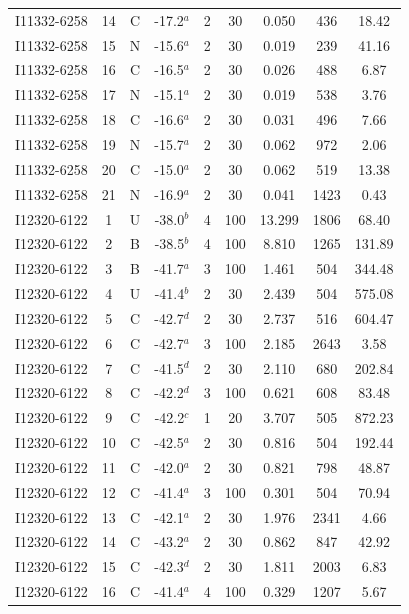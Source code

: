 \begin{table}
\begin{tabular}{ccccccccc}
I11332-6258 & 14 & C & -17.2$^{a}$ & 2 & 30 & 0.050 & 436 & 18.42 \\
I11332-6258 & 15 & N & -15.6$^{a}$ & 2 & 30 & 0.019 & 239 & 41.16 \\
I11332-6258 & 16 & C & -16.5$^{a}$ & 2 & 30 & 0.026 & 488 & 6.87 \\
I11332-6258 & 17 & N & -15.1$^{a}$ & 2 & 30 & 0.019 & 538 & 3.76 \\
I11332-6258 & 18 & C & -16.6$^{a}$ & 2 & 30 & 0.031 & 496 & 7.66 \\
I11332-6258 & 19 & N & -15.7$^{a}$ & 2 & 30 & 0.062 & 972 & 2.06 \\
I11332-6258 & 20 & C & -15.0$^{a}$ & 2 & 30 & 0.062 & 519 & 13.38 \\
I11332-6258 & 21 & N & -16.9$^{a}$ & 2 & 30 & 0.041 & 1423 & 0.43 \\
I12320-6122 & 1 & U & -38.0$^{b}$ & 4 & 100 & 13.299 & 1806 & 68.40 \\
I12320-6122 & 2 & B & -38.5$^{b}$ & 4 & 100 & 8.810 & 1265 & 131.89 \\
I12320-6122 & 3 & B & -41.7$^{a}$ & 3 & 100 & 1.461 & 504 & 344.48 \\
I12320-6122 & 4 & U & -41.4$^{b}$ & 2 & 30 & 2.439 & 504 & 575.08 \\
I12320-6122 & 5 & C & -42.7$^{d}$ & 2 & 30 & 2.737 & 516 & 604.47 \\
I12320-6122 & 6 & C & -42.7$^{a}$ & 3 & 100 & 2.185 & 2643 & 3.58 \\
I12320-6122 & 7 & C & -41.5$^{d}$ & 2 & 30 & 2.110 & 680 & 202.84 \\
I12320-6122 & 8 & C & -42.2$^{d}$ & 3 & 100 & 0.621 & 608 & 83.48 \\
I12320-6122 & 9 & C & -42.2$^{c}$ & 1 & 20 & 3.707 & 505 & 872.23 \\
I12320-6122 & 10 & C & -42.5$^{a}$ & 2 & 30 & 0.816 & 504 & 192.44 \\
I12320-6122 & 11 & C & -42.0$^{a}$ & 2 & 30 & 0.821 & 798 & 48.87 \\
I12320-6122 & 12 & C & -41.4$^{a}$ & 3 & 100 & 0.301 & 504 & 70.94 \\
I12320-6122 & 13 & C & -42.1$^{a}$ & 2 & 30 & 1.976 & 2341 & 4.66 \\
I12320-6122 & 14 & C & -43.2$^{a}$ & 2 & 30 & 0.862 & 847 & 42.92 \\
I12320-6122 & 15 & C & -42.3$^{d}$ & 2 & 30 & 1.811 & 2003 & 6.83 \\
I12320-6122 & 16 & C & -41.4$^{a}$ & 4 & 100 & 0.329 & 1207 & 5.67 \\

\end{tabular}
\end{table}
